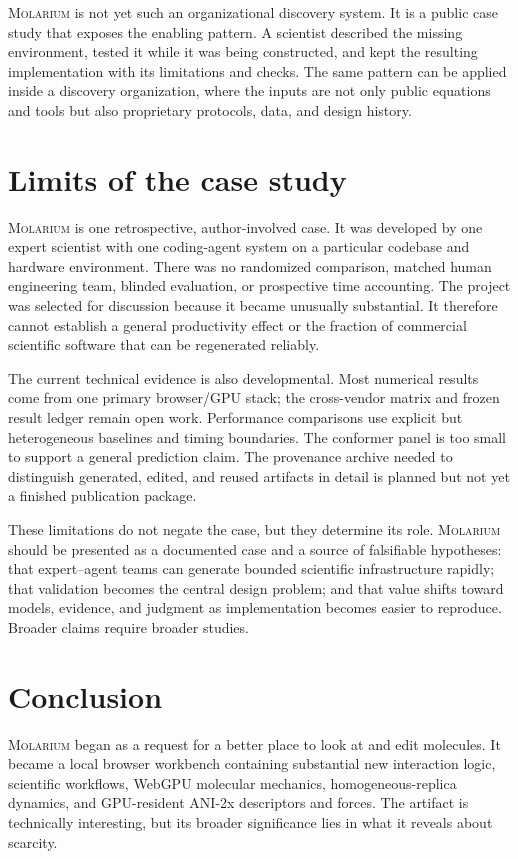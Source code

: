 \documentclass[11pt]{article}
\newcommand{\molarium}{\textnormal{\textsc{Molarium}}}
\begin{document}
\molarium{} is not yet such an organizational discovery system.
It is a public case study that exposes the enabling pattern.
A scientist described the missing environment, tested it while it was being constructed, and kept the resulting implementation with its limitations and checks.
The same pattern can be applied inside a discovery organization, where the inputs are not only public equations and tools but also proprietary protocols, data, and design history.

\section{Limits of the case study}
\label{sec:limits}

\molarium{} is one retrospective, author-involved case.
It was developed by one expert scientist with one coding-agent system on a particular codebase and hardware environment.
There was no randomized comparison, matched human engineering team, blinded evaluation, or prospective time accounting.
The project was selected for discussion because it became unusually substantial.
It therefore cannot establish a general productivity effect or the fraction of commercial scientific software that can be regenerated reliably.

The current technical evidence is also developmental.
Most numerical results come from one primary browser/GPU stack; the cross-vendor matrix and frozen result ledger remain open work.
Performance comparisons use explicit but heterogeneous baselines and timing boundaries.
The conformer panel is too small to support a general prediction claim.
The provenance archive needed to distinguish generated, edited, and reused artifacts in detail is planned but not yet a finished publication package.

These limitations do not negate the case, but they determine its role.
\molarium{} should be presented as a documented case and a source of falsifiable hypotheses: that expert--agent teams can generate bounded scientific infrastructure rapidly; that validation becomes the central design problem; and that value shifts toward models, evidence, and judgment as implementation becomes easier to reproduce.
Broader claims require broader studies.

\section{Conclusion}
\label{sec:conclusion}

\molarium{} began as a request for a better place to look at and edit molecules.
It became a local browser workbench containing substantial new interaction logic, scientific workflows, WebGPU molecular mechanics, homogeneous-replica dynamics, and GPU-resident ANI-2x descriptors and forces.
The artifact is technically interesting, but its broader significance lies in what it reveals about scarcity.
\end{document}
